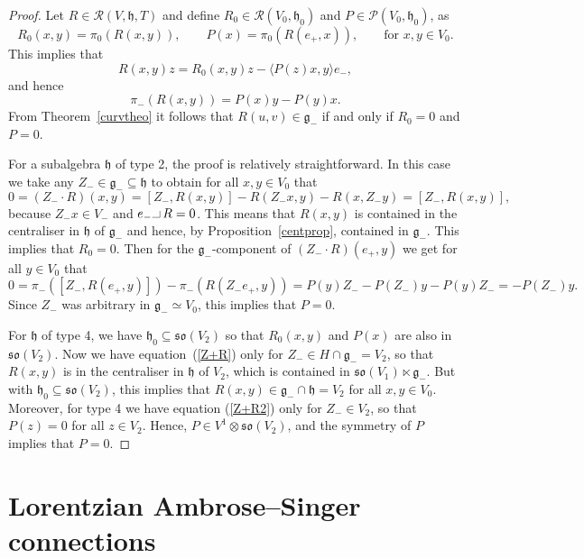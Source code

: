 \documentclass[11pt,a4paper]{amsart}
\newcommand{\g}{\mathfrak{g}}
\newcommand{\h}{\mathfrak{h}}
\newcommand{\+}{\oplus}
\newcommand{\so}{\mathfrak{so}}
\newcommand{\hook}{\makebox[7pt]{\rule{6pt}{.3pt}\rule{.3pt}{5pt}}\,}
\newcommand{\1}{\mathbf{1}}
\renewcommand{\H}{H}
\newcommand{\<}{\langle}
\renewcommand{\>}{\rangle}
\theoremstyle{definition}
\theoremstyle{plain}
\numberwithin{equation}{section}
\begin{document}
\begin{proof}
Let $R\in \mathcal R(V,\h,T)$ and define $R_0\in \mathcal R (V_0,\h_0)$ and $P\in \mathcal P(V_0,\h_0)$, as
\[
R_0(x,y)=\pi_0(R(x,y)),\qquad P(x)=\pi_0(R(e_+,x)),\qquad\text{for }x,y\in V_0.\]
This implies that 
\[
R(x,y)z=R_0(x,y)z - \< P(z)x,y\> e_-,\]
and hence
\[\pi_-(R(x,y))=P(x)y-P(y)x.
\]
From Theorem~\ref{curvtheo} it follows that $R(u,v)\in \g_-$ if and only  if $R_0=0$ and $P=0$. 

For a subalgebra $\h$ of type 2, the proof is relatively straightforward. In this case we take any  $Z_-\in \g_-\subseteq \h$ to obtain for all $x,y\in V_0$ that
\begin{equation}\label{Z+R}
0
=
(Z_-\cdot R)(x,y) = \left[ Z_-,R(x,y)\right] -R(Z_- x,y) - R(x,Z_-y) =\left[ Z_-,R(x,y)\right] , \end{equation}
because  $Z_-x\in V_-$ and $e_-\hook R=0$. This means that  $R(x,y)$ is contained in the centraliser in $\h$ of $\g_-$ and hence, by Proposition~\ref{centprop}, contained in $\g_-$. This implies that 
$R_0=0$. Then for the $\g_-$-component of $(Z_-\cdot R)(e_+,y)$ we get
for all  $y\in V_0$ that 
\begin{equation}\label{Z+R2}
0
 = \pi_-(\left[ Z_-,R(e_+,y)\right]) -\pi_-(R(Z_- e_+,y))
 =
 P(y)Z_-
 -
 P(Z_-)y-P(y)Z_-=-
 P(Z_-)y
  .\end{equation}
 Since $Z_-$ was arbitrary in $\g_-\simeq V_0$, this implies that $P=0$.
  
  


For $\h$ of type 4, we have $\h_0\subseteq \so(V_2)$ so that $R_0(x,y)$ and $P(x)$ are also  in $\so(V_2)$. Now we have equation~(\ref{Z+R}) only for $Z_-\in \H\cap \g_-=V_2$, so that $R(x,y)$ is in the centraliser in $\h$ of $V_2$, which is contained in $\so(V_1)\ltimes \g_-$. But with  $\h_0\subseteq \so(V_2)$, this implies that $R(x,y) \in \g_-\cap \h=V_2$ for all $x,y\in V_0$. Moreover, for type 4 we have equation (\ref{Z+R2}) only for $Z_-\in V_2$, so that $P(z)=0$ for all $z\in V_2$. Hence,  $P\in V^1\otimes \so(V_2)$, and the symmetry of $P$ implies that $P=0$.
\end{proof}

\section{Lorentzian Ambrose--Singer connections}
\label{LASCsec}
\end{document}
